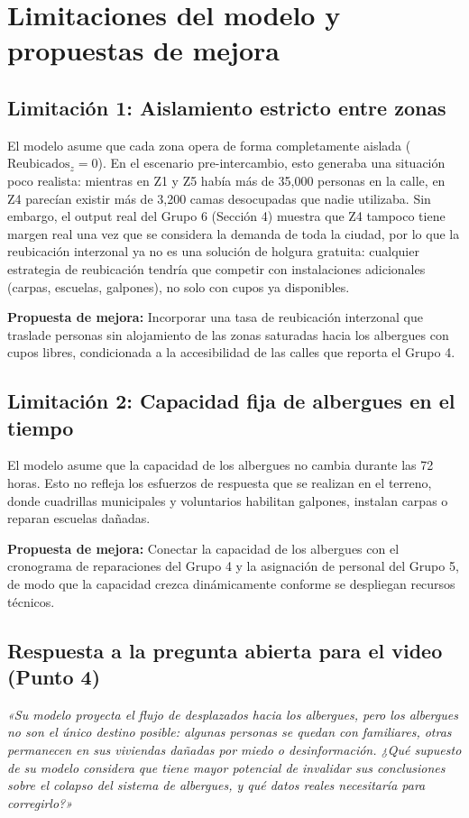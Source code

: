 \documentclass[10pt,letterpaper]{article}
\begin{document}
\section{Limitaciones del modelo y propuestas de mejora}

\subsection{Limitación 1: Aislamiento estricto entre zonas}
El modelo asume que cada zona opera de forma completamente aislada ($\text{Reubicados}_z = 0$). En el escenario pre-intercambio, esto generaba una situación poco realista: mientras en Z1 y Z5 había más de 35,000 personas en la calle, en Z4 parecían existir más de 3,200 camas desocupadas que nadie utilizaba. Sin embargo, el output real del Grupo 6 (Sección 4) muestra que Z4 tampoco tiene margen real una vez que se considera la demanda de toda la ciudad, por lo que la reubicación interzonal ya no es una solución de holgura gratuita: cualquier estrategia de reubicación tendría que competir con instalaciones adicionales (carpas, escuelas, galpones), no solo con cupos ya disponibles.

\textbf{Propuesta de mejora:} Incorporar una tasa de reubicación interzonal que traslade personas sin alojamiento de las zonas saturadas hacia los albergues con cupos libres, condicionada a la accesibilidad de las calles que reporta el Grupo 4.

\subsection{Limitación 2: Capacidad fija de albergues en el tiempo}
El modelo asume que la capacidad de los albergues no cambia durante las 72 horas. Esto no refleja los esfuerzos de respuesta que se realizan en el terreno, donde cuadrillas municipales y voluntarios habilitan galpones, instalan carpas o reparan escuelas dañadas.

\textbf{Propuesta de mejora:} Conectar la capacidad de los albergues con el cronograma de reparaciones del Grupo 4 y la asignación de personal del Grupo 5, de modo que la capacidad crezca dinámicamente conforme se despliegan recursos técnicos.

\subsection{Respuesta a la pregunta abierta para el video (Punto 4)}
\textit{«Su modelo proyecta el flujo de desplazados hacia los albergues, pero los albergues no son el único destino posible: algunas personas se quedan con familiares, otras permanecen en sus viviendas dañadas por miedo o desinformación. ¿Qué supuesto de su modelo considera que tiene mayor potencial de invalidar sus conclusiones sobre el colapso del sistema de albergues, y qué datos reales necesitaría para corregirlo?»}
\end{document}
